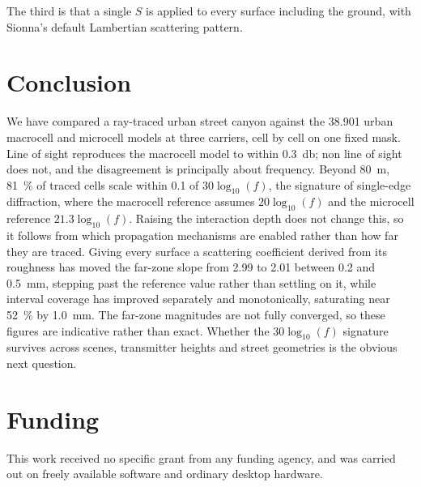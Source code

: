 \documentclass[conference]{IEEEtran}
\begin{document}
The third is that a single $S$ is applied to every surface including the
ground, with Sionna's default Lambertian scattering pattern.

\section{Conclusion}
\label{sec:conclusion}

We have compared a ray-traced urban street canyon against the 38.901 urban
macrocell and microcell models at three carriers, cell by cell on one fixed
mask. Line of sight reproduces the macrocell model to within
\SI{0.3}{\decibel}; non line of sight does not, and the disagreement is
principally about frequency. Beyond \SI{80}{\metre}, \SI{81}{\percent} of
traced cells scale within \num{0.1} of $30\log_{10}(f)$, the signature of
single-edge diffraction, where the macrocell reference assumes
$20\log_{10}(f)$ and the microcell reference $21.3\log_{10}(f)$.
Raising the interaction depth does not change this, so it follows from which
propagation mechanisms are enabled rather than how far they are traced. Giving
every surface a scattering coefficient derived from its roughness has moved
the far-zone slope from \num{2.99} to \num{2.01} between \SI{0.2}{} and
\SI{0.5}{\milli\metre}, stepping past the reference value rather than
settling on it, while interval coverage has improved separately and
monotonically, saturating near \SI{52}{\percent} by \SI{1.0}{\milli\metre}. The
far-zone magnitudes are not fully converged, so these figures are indicative
rather than exact. Whether the $30\log_{10}(f)$ signature survives across
scenes, transmitter heights and street geometries is the obvious next
question.

%

\section*{Funding}
This work received no specific grant from any funding agency, and was carried
out on freely available software and ordinary desktop hardware.
\end{document}
